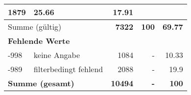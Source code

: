 \begin{longtable}{lXrrr}
       \num{1879} &
       \num[round-mode=places,round-precision=2]{25.66} &
         \num[round-mode=places,round-precision=2]{17.91} \\
     \midrule
     \multicolumn{2}{l}{Summe (gültig)} &
       \textbf{\num{7322}} &
     \textbf{\num{100}} &
       \textbf{\num[round-mode=places,round-precision=2]{69.77}} \\
     \multicolumn{5}{l}{\textbf{Fehlende Werte}}\\
       -998 &
       keine Angabe &
         \num{1084} &
        - &
         \num[round-mode=places,round-precision=2]{10.33} \\
       -989 &
       filterbedingt fehlend &
         \num{2088} &
        - &
         \num[round-mode=places,round-precision=2]{19.9} \\
     \midrule
     \multicolumn{2}{l}{\textbf{Summe (gesamt)}} &
          \textbf{\num{10494}} &
        \textbf{-} &
        \textbf{\num{100}} \\
     \bottomrule
     \end{longtable}
     
